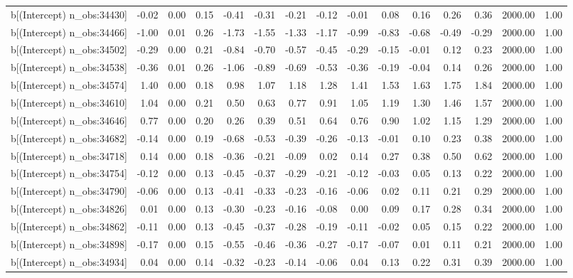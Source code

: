 \begin{table}[ht]
\begin{tabular}{rrrrrrrrrrrrrrr}
  b[(Intercept) n\_obs:34430] & -0.02 & 0.00 & 0.15 & -0.41 & -0.31 & -0.21 & -0.12 & -0.01 & 0.08 & 0.16 & 0.26 & 0.36 & 2000.00 & 1.00 \\ 
  b[(Intercept) n\_obs:34466] & -1.00 & 0.01 & 0.26 & -1.73 & -1.55 & -1.33 & -1.17 & -0.99 & -0.83 & -0.68 & -0.49 & -0.29 & 2000.00 & 1.00 \\ 
  b[(Intercept) n\_obs:34502] & -0.29 & 0.00 & 0.21 & -0.84 & -0.70 & -0.57 & -0.45 & -0.29 & -0.15 & -0.01 & 0.12 & 0.23 & 2000.00 & 1.00 \\ 
  b[(Intercept) n\_obs:34538] & -0.36 & 0.01 & 0.26 & -1.06 & -0.89 & -0.69 & -0.53 & -0.36 & -0.19 & -0.04 & 0.14 & 0.26 & 2000.00 & 1.00 \\ 
  b[(Intercept) n\_obs:34574] & 1.40 & 0.00 & 0.18 & 0.98 & 1.07 & 1.18 & 1.28 & 1.41 & 1.53 & 1.63 & 1.75 & 1.84 & 2000.00 & 1.00 \\ 
  b[(Intercept) n\_obs:34610] & 1.04 & 0.00 & 0.21 & 0.50 & 0.63 & 0.77 & 0.91 & 1.05 & 1.19 & 1.30 & 1.46 & 1.57 & 2000.00 & 1.00 \\ 
  b[(Intercept) n\_obs:34646] & 0.77 & 0.00 & 0.20 & 0.26 & 0.39 & 0.51 & 0.64 & 0.76 & 0.90 & 1.02 & 1.15 & 1.29 & 2000.00 & 1.00 \\ 
  b[(Intercept) n\_obs:34682] & -0.14 & 0.00 & 0.19 & -0.68 & -0.53 & -0.39 & -0.26 & -0.13 & -0.01 & 0.10 & 0.23 & 0.38 & 2000.00 & 1.00 \\ 
  b[(Intercept) n\_obs:34718] & 0.14 & 0.00 & 0.18 & -0.36 & -0.21 & -0.09 & 0.02 & 0.14 & 0.27 & 0.38 & 0.50 & 0.62 & 2000.00 & 1.00 \\ 
  b[(Intercept) n\_obs:34754] & -0.12 & 0.00 & 0.13 & -0.45 & -0.37 & -0.29 & -0.21 & -0.12 & -0.03 & 0.05 & 0.13 & 0.22 & 2000.00 & 1.00 \\ 
  b[(Intercept) n\_obs:34790] & -0.06 & 0.00 & 0.13 & -0.41 & -0.33 & -0.23 & -0.16 & -0.06 & 0.02 & 0.11 & 0.21 & 0.29 & 2000.00 & 1.00 \\ 
  b[(Intercept) n\_obs:34826] & 0.01 & 0.00 & 0.13 & -0.30 & -0.23 & -0.16 & -0.08 & 0.00 & 0.09 & 0.17 & 0.28 & 0.34 & 2000.00 & 1.00 \\ 
  b[(Intercept) n\_obs:34862] & -0.11 & 0.00 & 0.13 & -0.45 & -0.37 & -0.28 & -0.19 & -0.11 & -0.02 & 0.05 & 0.15 & 0.22 & 2000.00 & 1.00 \\ 
  b[(Intercept) n\_obs:34898] & -0.17 & 0.00 & 0.15 & -0.55 & -0.46 & -0.36 & -0.27 & -0.17 & -0.07 & 0.01 & 0.11 & 0.21 & 2000.00 & 1.00 \\ 
  b[(Intercept) n\_obs:34934] & 0.04 & 0.00 & 0.14 & -0.32 & -0.23 & -0.14 & -0.06 & 0.04 & 0.13 & 0.22 & 0.31 & 0.39 & 2000.00 & 1.00 \\ 

\end{tabular}
\end{table}
